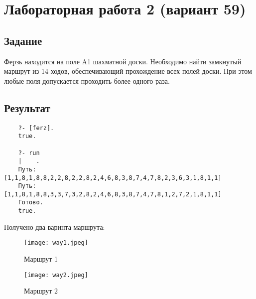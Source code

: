 \section{Лабораторная работа 2 (вариант 59)}
\subsection{Задание}


Ферзь находится на поле A1 шахматной доски. Необходимо найти замкнутый маршрут из 14 ходов, обеспечивающий прохождение всех полей доски. При этом любые поля допускается проходить более одного раза.

\subsection{Результат}
\begin{verbatim}
    ?- [ferz].
    true.

    ?- run
    |    .
    Путь: [1,1,8,1,8,8,2,2,8,2,2,8,2,4,6,8,3,8,7,4,7,8,2,3,6,3,1,8,1,1]
    Путь: [1,1,8,1,8,8,3,3,7,3,2,8,2,4,6,8,3,8,7,4,7,8,1,2,7,2,1,8,1,1]
    Готово.
    true.
\end{verbatim}

Получено два варинта маршрута:

\begin{figure}[H]
\centering
\texttt{[image: way1.jpeg]}
\caption{Маршрут 1}
\texttt{[image: way2.jpeg]}
\caption{Маршрут 2}
\label{img:ways}
\end{figure}

